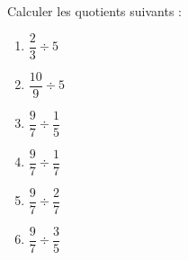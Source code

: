 
\begin{exercice}\label{exo2smath-0030}

    Calculer les quotients suivants :
    \begin{multicols}{3}
        \begin{enumerate}
            \item
                \( \dfrac{ 2 }{ 3 }\div 5\)
            \item
                \( \dfrac{ 10 }{ 9 }\div 5\)
            \item
                \( \dfrac{ 9 }{ 7 }\div\dfrac{ 1 }{ 5 }\)
            \item
                \( \dfrac{ 9 }{ 7 }\div\dfrac{ 1 }{ 7 }\)
            \item
                \( \dfrac{ 9 }{ 7 }\div\dfrac{ 2 }{ 7 }\)
            \item
                \( \dfrac{ 9 }{ 7 }\div\dfrac{ 3 }{ 5 }\)
        \end{enumerate}
    \end{multicols}

\end{exercice}
